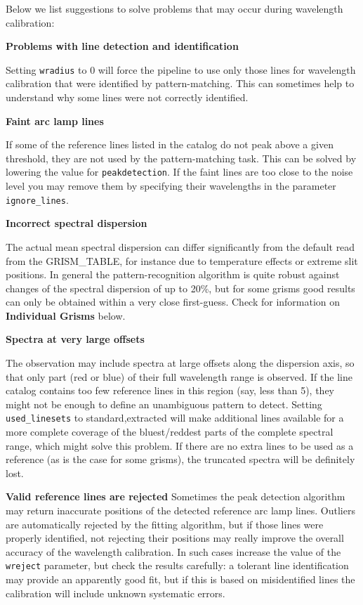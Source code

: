 Below we list suggestions to solve problems that may occur during wavelength calibration:

{\bf Problems with line detection and identification}

Setting {\tt wradius} to 0 will force the pipeline to use only those lines for wavelength calibration that were identified by pattern-matching. This can sometimes help to understand why some lines were not correctly identified.

{\bf Faint arc lamp lines}

If some of the reference lines listed in the catalog do not peak above a given threshold, they are not used by the pattern-matching task. This can be solved by lowering the value for {\tt peakdetection}. If the faint lines are too close to the noise level you may remove them by specifying their wavelengths in the parameter {\tt ignore\_lines}.

{\bf Incorrect spectral dispersion}

The actual mean spectral dispersion can differ significantly from the default read from the GRISM\_TABLE, for instance due to temperature effects or extreme slit positions. In general the
pattern-recognition algorithm is quite robust against changes of the spectral dispersion of up to 20\%, but for some grisms good results can only be obtained within a very close first-guess. Check for information on {\bf Individual Grisms} below.

{\bf Spectra at very large offsets}

The observation may include spectra at large offsets along the dispersion axis, so that only part (red or blue) of their full wavelength range is observed. If the line catalog contains too few
reference lines in this region (say, less than 5), they might not be enough to define an unambiguous pattern
to detect. Setting {\tt used\_linesets} to standard,extracted will make additional lines available for a more complete coverage of the bluest/reddest parts of the complete spectral range, which might
solve this problem. If there are no extra lines to be used as a reference (as is the case for some grisms), the truncated spectra will be definitely lost.


{\bf Valid reference lines are rejected}
Sometimes the peak detection algorithm may return inaccurate positions of the detected reference arc lamp lines. Outliers are automatically rejected by the fitting algorithm, but if those lines were properly identified, not
rejecting their positions may really improve the overall accuracy of the wavelength calibration.
In such cases increase the value of the {\tt wreject} parameter, but check the results carefully: a tolerant line
identification may provide an apparently good fit, but if this is based on misidentified lines the calibration will include unknown systematic errors.

